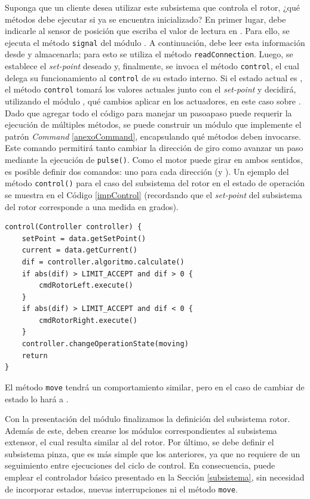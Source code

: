 Suponga que un cliente desea utilizar este subsistema que controla el rotor, ¿qué métodos debe ejecutar si ya se encuentra inicializado?
En primer lugar, debe indicarle al sensor de posición que escriba el valor de lectura en \Pipe. Para ello, se ejecuta el método \verb|signal| del módulo \SensorPosRotor. A continuación, \RotorCtrl debe leer esta información desde \Pipe y almacenarla; para esto se utiliza el método \verb|readConnection|. Luego, se establece el \textit{set-point} deseado y, finalmente, se invoca el método \verb|control|, el cual delega su funcionamiento al \verb|control| de su estado interno. Si el estado actual es \Waiting, el método \verb|control| tomará los valores actuales junto con el \textit{set-point} y decidirá, utilizando el módulo \Algoritmo, qué cambios aplicar en los actuadores, en este caso sobre \Rotor. Dado que agregar todo el código para manejar un \gls{pasoapaso} puede requerir la ejecución de múltiples métodos, se puede construir un módulo que implemente el patrón \textit{Command} \ref{anexoCommand}, encapsulando qué métodos deben invocarse. Este comando permitirá tanto cambiar la dirección de giro como avanzar un paso mediante la ejecución de \verb|pulse()|. Como el motor puede girar en ambos sentidos, es posible definir dos comandos: uno para cada dirección (\CmdRotorLeft y \CmdRotorRight). Un ejemplo del método \verb|control()| para el caso del subsistema del rotor en el estado de operación \Waiting se muestra en el Código \ref{impControl} (recordando que el \textit{set-point} del subsistema del rotor corresponde a una medida en grados).

\begin{lstlisting}[caption=Ejemplo de implementación del método control del módulo Waiting.,label={impControl}]
control(Controller controller) {
    setPoint = data.getSetPoint()
    current = data.getCurrent()
    dif = controller.algoritmo.calculate()
    if abs(dif) > LIMIT_ACCEPT and dif > 0 {
        cmdRotorLeft.execute()
    }
    if abs(dif) > LIMIT_ACCEPT and dif < 0 {
        cmdRotorRight.execute()        
    }
    controller.changeOperationState(moving)
    return
}
\end{lstlisting}

El método \verb|move| tendrá un comportamiento similar, pero en el caso de cambiar de estado lo hará a \Waiting.

Con la presentación del módulo \RobotCtrl finalizamos la definición del subsistema rotor. Además de este, deben crearse los módulos correspondientes al subsistema extensor, el cual resulta similar al del rotor.
Por último, se debe definir el subsistema pinza, que es más simple que los anteriores, ya que no requiere de un seguimiento entre ejecuciones del ciclo de control. En consecuencia, puede emplear el controlador básico presentado en la Sección \ref{subsistema}, sin necesidad de incorporar estados, nuevas interrupciones ni el método \verb|move|.

